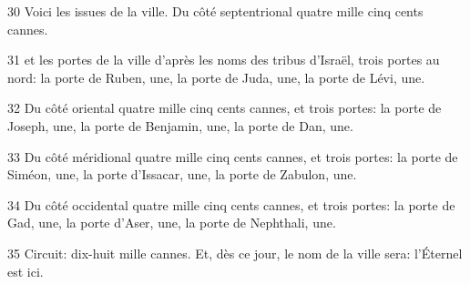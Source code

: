 \par 30 Voici les issues de la ville. Du côté septentrional quatre mille cinq cents cannes.
\par 31 et les portes de la ville d'après les noms des tribus d'Israël, trois portes au nord: la porte de Ruben, une, la porte de Juda, une, la porte de Lévi, une.
\par 32 Du côté oriental quatre mille cinq cents cannes, et trois portes: la porte de Joseph, une, la porte de Benjamin, une, la porte de Dan, une.
\par 33 Du côté méridional quatre mille cinq cents cannes, et trois portes: la porte de Siméon, une, la porte d'Issacar, une, la porte de Zabulon, une.
\par 34 Du côté occidental quatre mille cinq cents cannes, et trois portes: la porte de Gad, une, la porte d'Aser, une, la porte de Nephthali, une.
\par 35 Circuit: dix-huit mille cannes. Et, dès ce jour, le nom de la ville sera: l'Éternel est ici.


